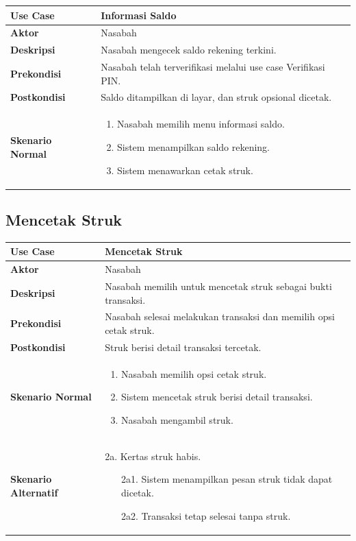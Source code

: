 \documentclass[conference,10pt]{IEEEtran}
\begin{document}
\begin{center}
\begin{tabular}{|L{2.3cm}|L{5cm}|}
\hline
\textbf{Use Case} & Informasi Saldo \\
\hline
\textbf{Aktor} & Nasabah \\
\hline
\textbf{Deskripsi} & Nasabah mengecek saldo rekening terkini. \\
\hline
\textbf{Prekondisi} & Nasabah telah terverifikasi melalui use case Verifikasi PIN. \\
\hline
\textbf{Postkondisi} & Saldo ditampilkan di layar, dan struk opsional dicetak. \\
\hline
\textbf{Skenario Normal} &
\begin{enumerate}
\setlength\itemsep{0pt}
\item Nasabah memilih menu informasi saldo.
\item Sistem menampilkan saldo rekening.
\item Sistem menawarkan cetak struk.
\end{enumerate} \\
\hline
\end{tabular}
\end{center}

\subsection{Mencetak Struk}

\begin{center}
\begin{tabular}{|L{2.3cm}|L{5cm}|}
\hline
\textbf{Use Case} & Mencetak Struk \\
\hline
\textbf{Aktor} & Nasabah \\
\hline
\textbf{Deskripsi} & Nasabah memilih untuk mencetak struk sebagai bukti transaksi. \\
\hline
\textbf{Prekondisi} & Nasabah selesai melakukan transaksi dan memilih opsi cetak struk. \\
\hline
\textbf{Postkondisi} & Struk berisi detail transaksi tercetak. \\
\hline
\textbf{Skenario Normal} &
\begin{enumerate}
\setlength\itemsep{0pt}
\item Nasabah memilih opsi cetak struk.
\item Sistem mencetak struk berisi detail transaksi.
\item Nasabah mengambil struk.
\end{enumerate} \\
\hline
\textbf{Skenario Alternatif} &
2a. Kertas struk habis.
\begin{enumerate}
\setlength\itemsep{0pt}
\item[2a1.] Sistem menampilkan pesan struk tidak dapat dicetak.
\item[2a2.] Transaksi tetap selesai tanpa struk.
\end{enumerate} \\
\hline
\end{tabular}
\end{center}
\end{document}
